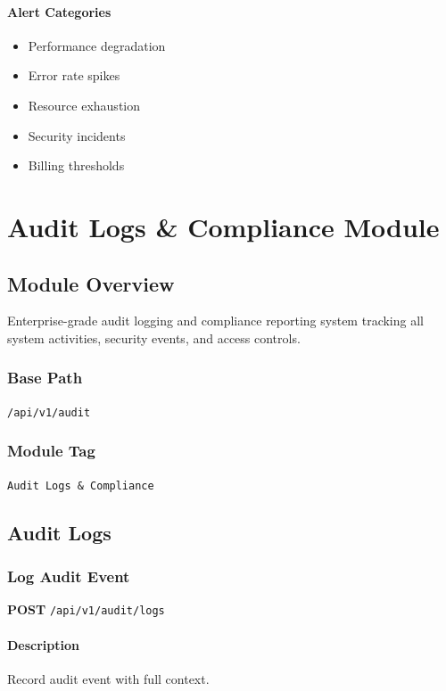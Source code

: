 \documentclass[11pt,a4paper]{report}
\begin{document}
\subsubsection{Alert Categories}
\begin{itemize}[leftmargin=*]
    \item Performance degradation
    \item Error rate spikes
    \item Resource exhaustion
    \item Security incidents
    \item Billing thresholds
\end{itemize}

\newpage

\chapter{Audit Logs \& Compliance Module}

\section{Module Overview}

Enterprise-grade audit logging and compliance reporting system tracking all system activities, security events, and access controls.

\subsection{Base Path}
\texttt{/api/v1/audit}

\subsection{Module Tag}
\texttt{Audit Logs \& Compliance}

\section{Audit Logs}

\subsection{Log Audit Event}

\textbf{POST} \texttt{/api/v1/audit/logs}

\subsubsection{Description}
Record audit event with full context.
\end{document}

